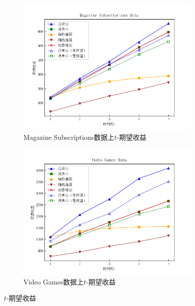 \begin{figure}[th]
    \begin{subfigure}{0.45\textwidth}
       \includegraphics[width=\linewidth]{figure/sasim/nonadp/non_cn_magazine}
        \caption{Magazine Subscriptions数据上$t$-期望收益}
        \label{fig:non3}
    \end{subfigure}
    \hfill
    \begin{subfigure}{0.45\textwidth}
        \includegraphics[width=\linewidth]{figure/sasim/nonadp/non_cn_video}
        \caption{Video Games数据上$t$-期望收益}
        \label{fig:non4}
    \end{subfigure}
    \caption{$t$-期望收益}
    \label{fig:non}
\end{figure}

